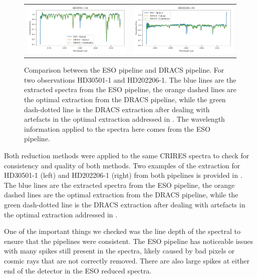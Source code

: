 \begin{figure}
\begin{tabular}{cc}
        \includegraphics[width=0.5\linewidth]{figures/reduction/pipeline_compare/pipeline_compare_HD30501-1_chip_4} & \includegraphics[width=0.5\linewidth]{figures/reduction/pipeline_compare/pipeline_compare_HD202206-1_chip_4}\\
    \end{tabular}
    \caption{Comparison between the {ESO} pipeline and {DRACS} pipeline. For two observations HD30501-1 and HD202206-1. The blue lines are the extracted spectra from the {ESO} pipeline, the orange dashed lines are the optimal extraction from the {DRACS} pipeline, while the green dash-dotted line is the {DRACS} extraction after dealing with artefacts in the optimal extraction addressed in . The wavelength information applied to the spectra here comes from the {ESO} pipeline.}
    \label{fig:reduction-comparison}
\end{figure}

Both reduction methods were applied to the same {CRIRES} spectra to check for consistency and quality of both methods. Two examples of the extraction for HD30501-1 (left) and HD202206-1 (right) from both pipelines is provided in . The blue lines are the extracted spectra from the {ESO} pipeline, the orange dashed lines are the optimal extraction from the {DRACS} pipeline, while the green dash-dotted line is the {DRACS} extraction after dealing with artefacts in the optimal extraction addressed in .

One of the important things we checked was the line depth of the spectral to ensure that the pipelines were consistent. The {ESO} pipeline has noticeable issues with many spikes still present in the spectra, likely caused by bad pixels or cosmic rays that are not correctly removed. There are also large spikes at either end of the detector in the {ESO} reduced spectra.

